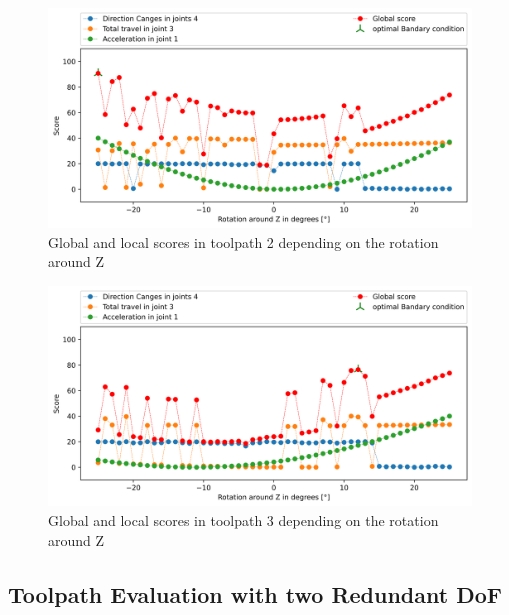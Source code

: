 \begin{figure}[H]
\centerline{\includegraphics[width=1\textwidth]{figures/best_c_2_combi.png}}
\caption{Global and local scores in toolpath 2 depending on the rotation around Z}
\label{TP2_combi}
\end{figure}
\begin{figure}[H]
\centerline{\includegraphics[width=1\textwidth]{figures/best_c_3_combi.png}}
\caption{Global and local scores in toolpath 3 depending on the rotation around Z}
\label{TP3_combi}
\end{figure}

\newpage
\subsection{Toolpath Evaluation with two Redundant DoF}

